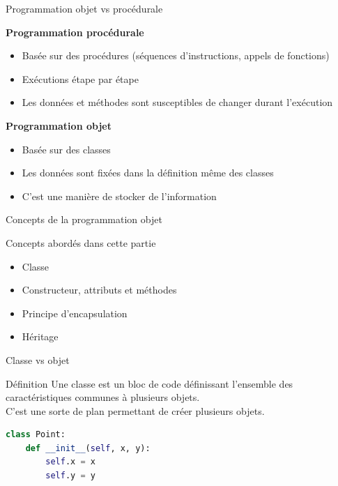\documentclass[10pt]{beamer}
\begin{document}
\begin{frame}{Programmation objet vs procédurale}

  \begin{minipage}[t]{0.48\textwidth}
  \textbf{Programmation procédurale}
  \begin{itemize}
    \item<1-> Basée sur des procédures (séquences d'instructions, appels de fonctions)
    \item<2-> Exécutions étape par étape
    \item<3-> Les données et méthodes sont susceptibles de changer durant l'exécution
  \end{itemize}
  \end{minipage}
  \hfill
  \begin{minipage}[t]{0.48\textwidth}
  \textbf{Programmation objet}
  \begin{itemize}
    \item<1-> Basée sur des classes
    \item<3-> Les données sont fixées dans la définition même des classes
    \item<4> C'est une manière de stocker de l'information
  \end{itemize}
  \end{minipage}
\end{frame}


\begin{frame}{Concepts de la programmation objet}
  \begin{block}{Concepts abordés dans cette partie}
    \medskip
    \begin{itemize}
      \item<+-> Classe 
      \item<+-> Constructeur, attributs et méthodes 
      \item<+-> Principe d'encapsulation
      \item<+-> Héritage
    \end{itemize}
  \end{block}
\end{frame}






\begin{frame}[fragile]{Classe vs objet}
  \begin{block}{Définition}
    \medskip
    Une classe est un bloc de code définissant l'ensemble des caractéristiques communes à plusieurs objets.\\
    C'est une sorte de plan permettant de créer plusieurs objets.
  \end{block}
\bigskip
\begin{lstlisting}[language=Python, numbers=none]
class Point:
    def __init__(self, x, y):
        self.x = x
        self.y = y
\end{lstlisting}

\end{frame}
\end{document}
